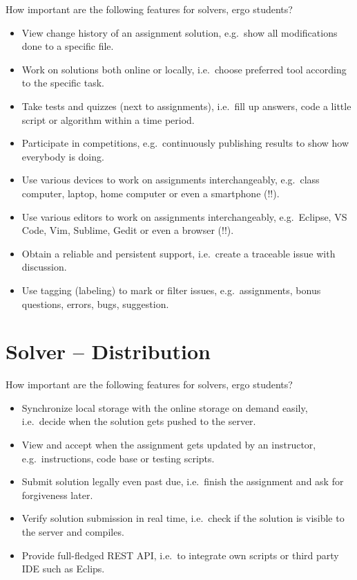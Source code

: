 How important are the following features for solvers, ergo students?

\begin{itemize}
\item
  View change history of an assignment solution, e.g.~show all modifications done to a specific file.
\item
  Work on solutions both online or locally, i.e.~choose preferred tool according to the specific task.
\item
  Take tests and quizzes (next to assignments), i.e.~fill up answers, code a little script or algorithm within a time period.
\item
  Participate in competitions, e.g.~continuously publishing results to show how everybody is doing.
\item
  Use various devices to work on assignments interchangeably, e.g.~class computer, laptop, home computer or even a smartphone (!!).
\item
  Use various editors to work on assignments interchangeably, e.g.~Eclipse, VS Code, Vim, Sublime, Gedit or even a browser (!!).
\item
  Obtain a reliable and persistent support, i.e.~create a traceable issue with discussion.
\item
  Use tagging (labeling) to mark or filter issues, e.g.~assignments, bonus questions, errors, bugs, suggestion.
\end{itemize}

\section{Solver -- Distribution}\label{sec:solver-distribution}

How important are the following features for solvers, ergo students?

\begin{itemize}
\item
  Synchronize local storage with the online storage on demand easily, i.e.~decide when the solution gets pushed to the server.
\item
  View and accept when the assignment gets updated by an instructor, e.g.~instructions, code base or testing scripts.
\item
  Submit solution legally even past due, i.e.~finish the assignment and ask for forgiveness later.
\item
  Verify solution submission in real time, i.e.~check if the solution is visible to the server and compiles.
\item
  Provide full-fledged REST API, i.e.~to integrate own scripts or third party IDE such as Eclips.
\end{itemize}


